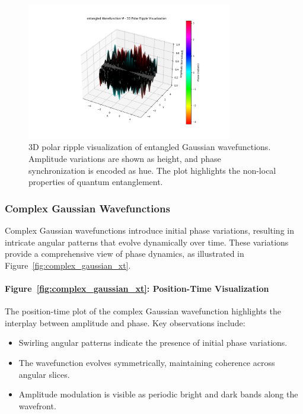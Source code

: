 \documentclass[12pt]{article}
\begin{document}
\begin{figure}[H]
\centering
\includegraphics[width=0.8\textwidth]{images/entangled_wavefunction_3d_polar_probability_density_with_phase.png}
\caption{3D polar ripple visualization of entangled Gaussian wavefunctions. Amplitude variations are shown as height, and phase synchronization is encoded as hue. The plot highlights the non-local properties of quantum entanglement.}
\label{fig:entangled_3d_polar}
\end{figure}

\subsubsection{Complex Gaussian Wavefunctions}
Complex Gaussian wavefunctions introduce initial phase variations, resulting in intricate angular patterns that evolve dynamically over time. These variations provide a comprehensive view of phase dynamics, as illustrated in Figure~\ref{fig:complex_gaussian_xt}.

\paragraph{Figure~\ref{fig:complex_gaussian_xt}: Position-Time Visualization}
The position-time plot of the complex Gaussian wavefunction highlights the interplay between amplitude and phase. Key observations include:
\begin{itemize}
    \item Swirling angular patterns indicate the presence of initial phase variations.
    \item The wavefunction evolves symmetrically, maintaining coherence across angular slices.
    \item Amplitude modulation is visible as periodic bright and dark bands along the wavefront.
\end{itemize}
\end{document}

